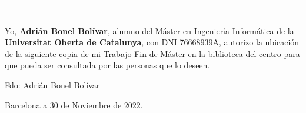 \noindent\rule[-1ex]{\textwidth}{2pt}\\[4.5ex]

Yo, \textbf{Adrián Bonel Bolívar}, alumno del Máster en Ingeniería Informática de la \textbf{Universitat Oberta de Catalunya}, con DNI 76668939A, autorizo la
ubicación de la siguiente copia de mi Trabajo Fin de Máster en la biblioteca del centro para que pueda ser
consultada por las personas que lo deseen.

\vspace{6cm}

\noindent Fdo: Adrián Bonel Bolívar

\vspace{2cm}

\begin{flushright}
Barcelona a 30 de Noviembre de 2022.
\end{flushright}








